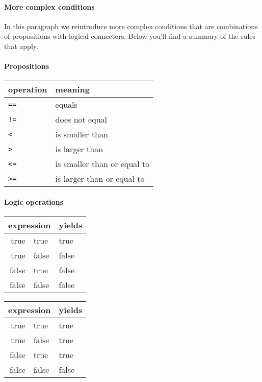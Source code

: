 \paragraph{More complex conditions}

In this paragraph we reintroduce more complex conditions that are combinations of propositions with logical connectors. Below you'll find a summary of the rules that apply.

\paragraph{Propositions}
\begin{center}
\begin{tabular}{ll}
\textbf{operation} &        \textbf{meaning}\\
\midrule
      \texttt{==} &               equals\\
      \texttt{!=} &          does not equal\\
       \texttt{<} &              is smaller than\\
       \texttt{>} &               is larger than\\
      \texttt{<=} &  is smaller than or equal to\\
      \texttt{>=} &  is larger than or equal to\\
\midrule
\end{tabular}
\end{center}

\paragraph{Logic operations}
\begin{center}
  \ttfamily
  \begin{tabular}{r@{ \&\& }l@{\qquad}l}
    \multicolumn{2}{l}{\normalfont expression} & {\normalfont yields} \\
    \midrule
    true & true   & true \\
    true & false & false \\
    false & true  & false \\
    false & false  & false \\
    \midrule
  \end{tabular}
  \qquad
  \begin{tabular}{r@{ || }l@{\qquad}l}
    \multicolumn{2}{l}{\normalfont expression} & {\normalfont yields} \\
    \midrule
    true  & true   & true \\
    true  & false  & true \\
    false & true   & true \\
    false & false  & false \\
    \midrule
  \end{tabular}
\end{center}

